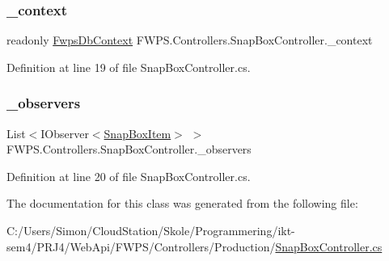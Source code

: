 \subsubsection{\texorpdfstring{\+\_\+context}{\_context}}
{\footnotesize\ttfamily readonly \mbox{\hyperlink{class_f_w_p_s_1_1_data_1_1_fwps_db_context}{Fwps\+Db\+Context}} F\+W\+P\+S.\+Controllers.\+Snap\+Box\+Controller.\+\_\+context\hspace{0.3cm}{\ttfamily [private]}}



Definition at line 19 of file Snap\+Box\+Controller.\+cs.

\mbox{\label{class_f_w_p_s_1_1_controllers_1_1_snap_box_controller_a8b970aa8784b1349cd3276235d7a453c}} 
\subsubsection{\texorpdfstring{\+\_\+observers}{\_observers}}
{\footnotesize\ttfamily List$<$I\+Observer$<$\mbox{\hyperlink{class_f_w_p_s_1_1_models_1_1_snap_box_item}{Snap\+Box\+Item}}$>$ $>$ F\+W\+P\+S.\+Controllers.\+Snap\+Box\+Controller.\+\_\+observers\hspace{0.3cm}{\ttfamily [private]}}



Definition at line 20 of file Snap\+Box\+Controller.\+cs.



The documentation for this class was generated from the following file\+:\begin{DoxyCompactItemize}
\item 
C\+:/\+Users/\+Simon/\+Cloud\+Station/\+Skole/\+Programmering/ikt-\/sem4/\+P\+R\+J4/\+Web\+Api/\+F\+W\+P\+S/\+Controllers/\+Production/\mbox{\hyperlink{_snap_box_controller_8cs}{Snap\+Box\+Controller.\+cs}}\end{DoxyCompactItemize}
